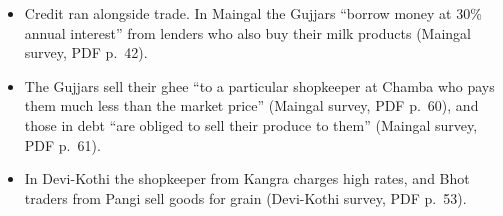 \documentclass[11pt,a4paper]{article}
\newcommand{\cit}[1]{{\small(#1)}}
\begin{document}
\begin{itemize}
  moneylender and the shopkeeper \cit{Appendix Table~\ref{tab:flows}}.
\item Credit ran alongside trade. In Maingal the Gujjars \enquote{borrow money at
  30\% annual interest} from lenders who also buy their milk products
  \cit{Maingal survey, PDF p.~42}.
\item The Gujjars sell their ghee \enquote{to a particular shopkeeper at Chamba
  who pays them much less than the market price} \cit{Maingal survey, PDF
  p.~60}, and those in debt \enquote{are obliged to sell their produce to them}
  \cit{Maingal survey, PDF p.~61}.
\item In Devi-Kothi the shopkeeper from Kangra charges high rates, and Bhot
  traders from Pangi sell goods for grain \cit{Devi-Kothi survey, PDF p.~53}.
\end{itemize}
\end{document}
